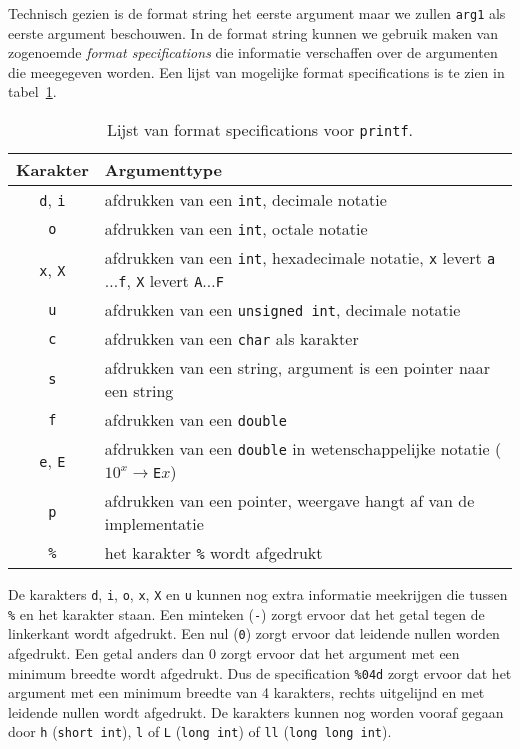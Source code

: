 Technisch gezien is de format string het eerste argument maar we zullen \texttt{arg1} als eerste argument beschouwen. In de format string kunnen we gebruik maken van zogenoemde \textsl{format specifications} die informatie verschaffen over de argumenten die meegegeven worden. Een lijst van mogelijke format specifications is te zien in tabel~\ref{tab:invprintf}.

\begin{table}[!ht]
\centering
\caption{Lijst van format specifications voor \texttt{printf}.}
\label{tab:invprintf}
\begin{tabular}{@{}cl@{}}
\toprule
Karakter & Argumenttype \\
\midrule 
\texttt{d}, \texttt{i} & afdrukken van een \texttt{int}, decimale notatie\\
\texttt{o} & afdrukken van een \texttt{int}, octale notatie\\
\texttt{x}, \texttt{X} & afdrukken van een \texttt{int}, hexadecimale notatie, \texttt{x} levert \texttt{a$\ldots$f}, \texttt{X} levert \texttt{A$\ldots$F}\\
\texttt{u} & afdrukken van een \texttt{unsigned int}, decimale notatie\\
\texttt{c} & afdrukken van een \texttt{char} als karakter\\
\texttt{s} & afdrukken van een string, argument is een pointer naar een string\\
\texttt{f} & afdrukken van een \texttt{double}\\
\texttt{e}, \texttt{E} & afdrukken van een \texttt{double} in wetenschappelijke notatie ($10^x\!\rightarrow$\texttt{E}$x$)\\
\texttt{p} & afdrukken van een pointer, weergave hangt af van de implementatie\\
\texttt{\%} & het karakter \texttt{\%} wordt afgedrukt\\
\bottomrule
\end{tabular}
\end{table}

De karakters \texttt{d}, \texttt{i}, \texttt{o}, \texttt{x}, \texttt{X} en \texttt{u} kunnen nog extra informatie meekrijgen die tussen \texttt{\%} en het karakter staan. Een minteken (\texttt{-}) zorgt ervoor dat het getal tegen de linkerkant wordt afgedrukt. Een nul (\texttt{0}) zorgt ervoor dat leidende nullen worden afgedrukt. Een getal anders dan 0 zorgt ervoor dat het argument met een minimum breedte wordt afgedrukt. Dus de specification \texttt{\%04d} zorgt ervoor dat het argument met een minimum breedte van 4 karakters, rechts uitgelijnd en met leidende nullen wordt afgedrukt. De karakters kunnen nog worden vooraf gegaan door \texttt{h} (\texttt{short int}), \texttt{l} of \texttt{L} (\texttt{long int}) of \texttt{ll} (\texttt{long long int}).

